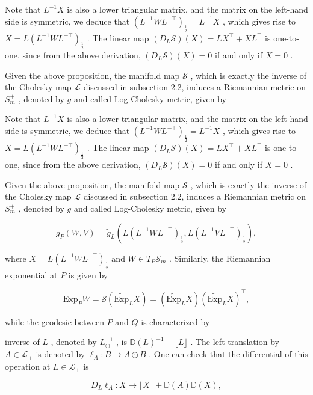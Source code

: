 \documentclass[11pt]{article}
\begin{document}
Note that  $L^{-1}X$  is also a lower triangular matrix, and the matrix on the left-hand side is symmetric, we deduce that  $(L^{-1}WL^{-\top})_{\frac{1}{2}} = L^{-1}X$ , which gives rise to  $X = L(L^{-1}WL^{-\top})_{\frac{1}{2}}$ . The linear map  $(D_L\mathcal{S})(X) = LX^\top +XL^\top$  is one-to-one, since from the above derivation,  $(D_L\mathcal{S})(X) = 0$  if and only if  $X = 0$ .

Given the above proposition, the manifold map  $\mathcal{S}$ , which is exactly the inverse of the Cholesky map  $\mathcal{L}$  discussed in subsection 2.2, induces a Riemannian metric on  $S_{m}^{+}$ , denoted by  $g$  and called Log-Cholesky metric, given by

Note that  $L^{-1}X$  is also a lower triangular matrix, and the matrix on the left-hand side is symmetric, we deduce that  $(L^{-1}WL^{-\top})_{\frac{1}{2}} = L^{-1}X$ , which gives rise to  $X = L(L^{-1}WL^{-\top})_{\frac{1}{2}}$ . The linear map  $(D_L\mathcal{S})(X) = LX^\top +XL^\top$  is one-to-one, since from the above derivation,  $(D_L\mathcal{S})(X) = 0$  if and only if  $X = 0$ .

Given the above proposition, the manifold map  $\mathcal{S}$ , which is exactly the inverse of the Cholesky map  $\mathcal{L}$  discussed in subsection 2.2, induces a Riemannian metric on  $S_{m}^{+}$ , denoted by  $g$  and called Log-Cholesky metric, given by

$$
g _ {P} (W, V) = \tilde {g} _ {L} \left(L \left(L ^ {- 1} W L ^ {- \top}\right) _ {\frac {1}{2}}, L \left(L ^ {- 1} V L ^ {- \top}\right) _ {\frac {1}{2}}\right), \tag {3.1}
$$

where  $X = L(L^{-1}WL^{-\top})_{\frac{1}{2}}$  and  $W \in T_P\mathcal{S}_m^+$ . Similarly, the Riemannian exponential at  $P$  is given by

$$
\mathrm {E x p} _ {P} W = \mathcal {S} (\widetilde {\mathrm {E x p}} _ {L} X) = (\widetilde {\mathrm {E x p}} _ {L} X) (\widetilde {\mathrm {E x p}} _ {L} X) ^ {\top},
$$

while the geodesic between  $P$  and  $Q$  is characterized by

inverse of  $L$ , denoted by  $L_{\odot}^{-1}$ , is  $\mathbb{D}(L)^{-1} - \lfloor L\rfloor$ . The left translation by  $A\in \mathcal{L}_{+}$  is denoted by  $\ell_A:B\mapsto A\odot B$ . One can check that the differential of this operation at  $L\in \mathcal{L}_{+}$  is

$$
D _ {L} \ell_ {A}: X \mapsto \lfloor X \rfloor + \mathbb {D} (A) \mathbb {D} (X), \tag {3.2}
$$
\end{document}
